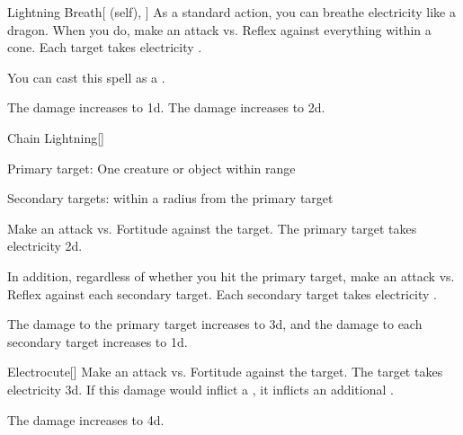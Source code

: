 \lowercase{\hypertarget{spell:Lightning Breath}{}}\label{spell:Lightning Breath}
\begin{attuneability}[Rank 4]{\hypertarget{spell:Lightning Breath}{Lightning Breath}}[ (self), ]
As a standard action, you can breathe electricity like a dragon.
When you do, make an attack vs. Reflex against everything within a \arealarge cone.
\hit Each target takes electricity .

You can cast this spell as a .

\rankline
{} The damage increases to  \plus1d.
 The damage increases to  \plus2d.
\end{attuneability}
\vspace{0.25em}



\lowercase{\hypertarget{spell:Chain Lightning}{}}\label{spell:Chain Lightning}
\begin{freeability}[Rank 5]{\hypertarget{spell:Chain Lightning}{Chain Lightning}}[]

Primary target: One creature or object within \rngmed range
\par\noindent
Secondary targets:  within a \areasmall radius from the primary target

Make an attack vs. Fortitude against the target.
\hit The primary target takes electricity  \plus2d.

In addition, regardless of whether you hit the primary target, make an attack vs. Reflex against each secondary target.
\hit Each secondary target takes electricity .

\rankline
{} The damage to the primary target increases to  \plus3d, and the damage to each secondary target increases to  \plus1d.
\end{freeability}
\vspace{0.25em}



\lowercase{\hypertarget{spell:Electrocute}{}}\label{spell:Electrocute}
\begin{freeability}[Rank 5]{\hypertarget{spell:Electrocute}{Electrocute}}[]
Make an attack vs. Fortitude against the target.
\hit The target takes electricity  \plus3d.
If this damage would inflict a , it inflicts an additional .

\rankline
{} The damage increases to  \plus4d.
\end{freeability}
\vspace{0.25em}



